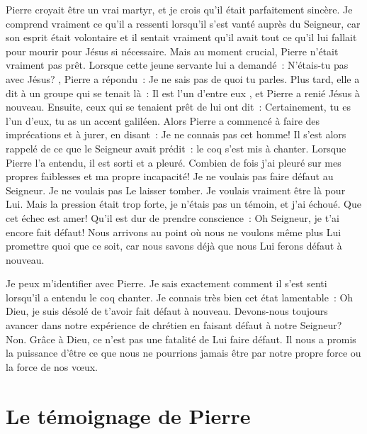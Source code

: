 Pierre croyait être un vrai martyr,
 et je crois qu'il était parfaitement sincère.
 Je comprend vraiment ce qu'il a ressenti lorsqu'il s'est vanté
 auprès du Seigneur, car son esprit était volontaire et il sentait
 vraiment qu'il avait tout ce qu'il lui fallait pour mourir pour Jésus
 si nécessaire. Mais au moment crucial, Pierre n'était vraiment pas prêt.
 Lorsque cette jeune servante lui a demandé~:
 \og N'étais-tu pas avec Jésus? \fg{}, Pierre a répondu~:
 \og Je ne sais pas de quoi tu parles. \fg{}
 Plus tard, elle a dit à un groupe qui se tenait là~:
 \og Il est l'un d'entre eux \fg{}, et Pierre a renié Jésus à nouveau.
 Ensuite, ceux qui se tenaient prêt de lui ont dit~:
 \og Certainement, tu es l'un d'eux, tu as un accent galiléen. \fg{}
 Alors Pierre a commencé à faire des imprécations et à jurer, en disant~:
 \og Je ne connais pas cet homme! \fg{}
 Il s'est alors rappelé de ce que le Seigneur avait prédit~:
 le coq s'est mis à chanter.
 Lorsque Pierre l'a entendu, il est sorti et a pleuré.
 Combien de fois j'ai pleuré sur mes propres faiblesses
 et ma propre incapacité! Je ne voulais pas faire défaut au Seigneur.
 Je ne voulais pas Le laisser tomber. Je voulais vraiment être là pour Lui.
 Mais la pression était trop forte, je n'étais pas un témoin,
 et j'ai échoué. Que cet échec est amer!
 Qu'il est dur de prendre conscience~:
 \og Oh Seigneur, je t'ai encore fait défaut! \fg{}
 Nous arrivons au point où nous ne voulons même plus Lui promettre quoi
 que ce soit, car nous savons déjà que nous Lui ferons défaut à nouveau.

Je peux m'identifier avec Pierre.
 Je sais exactement comment il s'est senti lorsqu'il a entendu le coq chanter.
 Je connais très bien cet état lamentable~:
 \og Oh Dieu, je suis désolé de t'avoir fait défaut à nouveau. \fg{}
 Devons-nous toujours avancer dans notre expérience de chrétien
 en faisant défaut à notre Seigneur? Non.
 Grâce à Dieu, ce n'est pas une fatalité de Lui faire défaut.
 Il nous a promis la puissance d'être ce que nous ne pourrions
 jamais être par notre propre force ou la force de nos vœux.


\section{Le t\'emoignage de Pierre}

